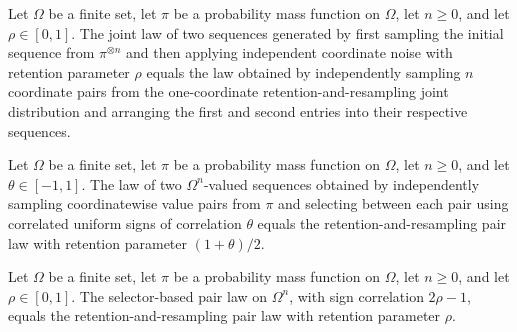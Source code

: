\begin{theorem}
\label{FABL.productRetentionPairPMF_eq_coordinateProduct}
\leanok
{}
Let $\Omega$ be a finite set, let $\pi$ be a probability mass function on $\Omega$, let
$n\ge 0$, and let $\rho\in[0,1]$. The joint law of two sequences generated by first
sampling the initial sequence from $\pi^{\otimes n}$ and then applying independent
coordinate noise with retention parameter $\rho$ equals the law obtained by
independently sampling $n$ coordinate pairs from the one-coordinate
retention-and-resampling joint distribution and arranging the first and second entries
into their respective sequences.
\end{theorem}

\begin{theorem}
\label{FABL.productSelectorPairPMF_eq_productRetention}
\leanok
{}
Let $\Omega$ be a finite set, let $\pi$ be a probability mass function on $\Omega$, let
$n\ge 0$, and let $\theta\in[-1,1]$. The law of two $\Omega^n$-valued sequences obtained
by independently sampling coordinatewise value pairs from $\pi$ and selecting between
each pair using correlated uniform signs of correlation $\theta$ equals the
retention-and-resampling pair law with retention parameter $(1+\theta)/2$.
\end{theorem}

\begin{theorem}
\label{FABL.productSelectorPairPMF_retentionCorrelation}
\leanok
{}
Let $\Omega$ be a finite set, let $\pi$ be a probability mass function on $\Omega$, let
$n\ge 0$, and let $\rho\in[0,1]$. The selector-based pair law on $\Omega^n$, with sign
correlation $2\rho-1$, equals the retention-and-resampling pair law with retention
parameter $\rho$.
\end{theorem}

